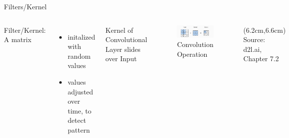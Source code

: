 \documentclass[citestyle=authoryear,bibstyle=numeric,hyperref,backend=biber]{sdqbeamer}
\begin{document}
\begin{frame}{Filters/Kernel}
    \begin{columns}
        Filter/Kernel: A matrix
        \begin{itemize}
            \item initalized with random values
            \item values adjusted over time, to detect pattern
        \end{itemize}
        Kernel of Convolutional Layer slides over Input
        \begin{figure}
            \centering
            \includegraphics[width=1\textwidth]{pictures/convolution.png}
            \caption{Convolution Operation}
            \label{fig:typical-CNN}
        \end{figure}
         \begin{textblock*}{6cm}(6.2cm,6.6cm) %
             \tiny{Source: d2l.ai, Chapter 7.2}
        \end{textblock*}
    \end{columns}
\end{frame}
\end{document}
